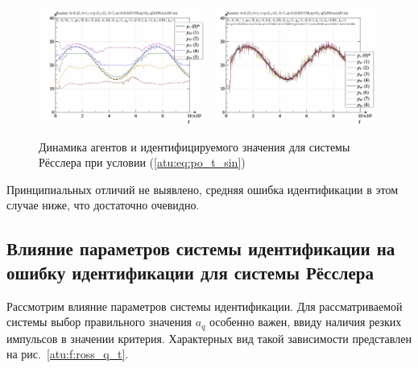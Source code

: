 \begin{figure}[ht!]
\begin{center}
  \includegraphics[width=0.49\textwidth]{p/cha/ross/ross_id-p_t_pi_ql3rlWvnAAW_sin.png}
  \hfill
  \includegraphics[width=0.49\textwidth]{p/cha/ross/ross_id-p_t_p_ql3rlWvnAAW_sin.png}
\end{center}
  \caption{Динамика агентов и идентифицируемого значения для системы Рёсслера при условии (\ref{atu:eq:po_t_sin})}
\label{atu:f:ross_id_sin}
\end{figure}

Принципиальных отличий не выявлено, средняя ошибка идентификации в этом
случае ниже, что достаточно очевидно.



\subsection{Влияние параметров системы идентификации на ошибку идентификации для системы Рёсслера}  %

Рассмотрим влияние параметров системы идентификации.
Для рассматриваемой системы выбор правильного значения $a_q$
особенно важен, ввиду наличия резких импульсов в значении критерия.
Характерных вид такой зависимости представлен на рис.~\ref{atu:f:ross_q_t}.

